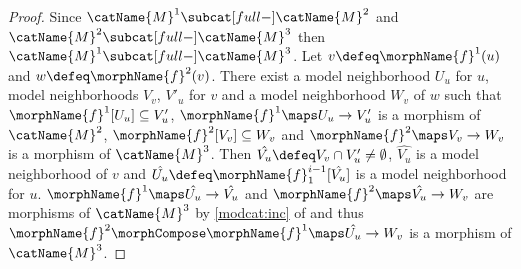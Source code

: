 \documentclass{article}
\begin{document}
\begin{lemma}
\begin{proof}
Since $\catName{M}^1 \subcat[full-] \catName{M}^2$ and
$\catName{M}^2 \subcat[full-] \catName{M}^3$ then
$\catName{M}^1 \subcat[full-] \catName{M}^3$.
Let  $v \defeq \morphName{f}^1(u)$ and
$w \defeq \morphName{f}^2(v)$. There exist a model neighborhood $U_u$
for $u$, model neighborhoods $V_v$, $V'_u$ for $v$ and a model
neighborhood $W_v$ of $w$ such that
$\morphName{f}^1[U_u] \subseteq V'_u$,
$\morphName{f}^1 \maps U_u \to V'_u$ is a morphism of $\catName{M}^2$,
$\morphName{f}^2[V_v] \subseteq W_v$ and
$\morphName{f}^2 \maps V_v \to W_v$ is a morphism of $\catName{M}^3$.
Then $\hat{V_u} \defeq V_v \cap V'_u \neq \emptyset$, $\hat{V_u}$ is a
model neighborhood of $v$ and
$\hat{U_u} \defeq \morphName{f}^{i-1}_1[\hat{V_u}]$ is a model
neighborhood for $u$.  $\morphName{f}^1 \maps \hat{U_u} \to \hat{V_u}$
and $\morphName{f}^2 \maps \hat{V_u} \to W_v$ are morphisms of
$\catName{M}^3$ by
{
  \showlabelsinline
  \cref{modcat:inc}
}
of  and thus
$\morphName{f}^2 \morphCompose \morphName{f}^1 \maps \hat{U_u} \to W_v$ is a
morphism of $\catName{M}^3$.
\end{proof}
\end{lemma}
\end{document}
